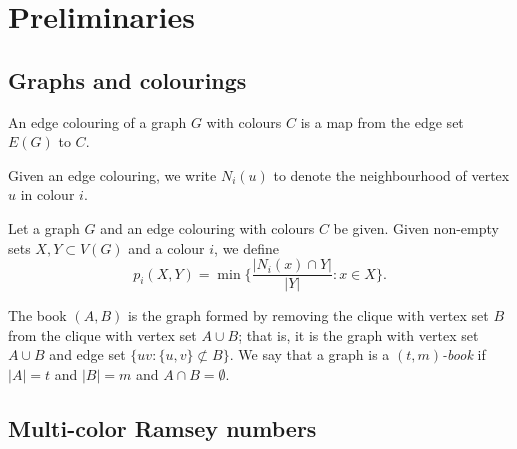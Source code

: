 \section{Preliminaries}

\subsection{Graphs and colourings}

\begin{definition}
  \label{def:edge-colouring}
  \leanok
  An edge colouring of a graph $G$ with colours $C$ is a map from the edge set $E(G)$ to $C$.
\end{definition}

\begin{definition}
  \label{def:colour-neighborhood}
  \leanok
  Given an edge colouring, we write $N_i(u)$ to denote the neighbourhood of vertex $u$ in colour $i$.
\end{definition}

\begin{definition}
  \label{def:p}
  Let a graph $G$ and an edge colouring with colours $C$ be given.
  Given non-empty sets $X,Y \subset V(G)$ and a colour $i$, we define
  \begin{equation*}
    p_i(X,Y) = \min\bigg\{ \frac{|N_i(x) \cap Y|}{|Y|} : x \in X \bigg\}.
  \end{equation*}
\end{definition}

\begin{definition}
  \label{def:book-graph}
  \leanok
  The book $(A,B)$ is the graph formed by removing the clique with vertex set $B$ from the clique with vertex set $A \cup B$;
  that is, it is the graph with vertex set $A \cup B$ and edge set $\big\{ uv : \{u,v\} \not\subset B \big\}.$
  We say that a graph is a \emph{$(t,m)$-book} if $|A| = t$ and $|B|= m$ and $A \cap B = \emptyset$.
\end{definition}

\subsection{Multi-color Ramsey numbers}

